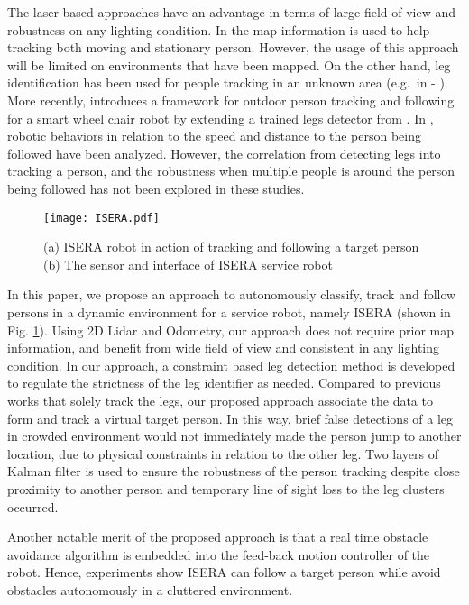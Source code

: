 \documentclass[10 pt,a4paper,conference]{IEEEtran}
\begin{document}
The laser based approaches have an advantage in terms of large field of
view and robustness on any lighting condition. In \cite{ref3} the map
information is used to help tracking both moving and stationary person.
However, the usage of this approach will be limited on environments that
have been mapped. On the other hand, leg identification has been used
for people tracking in an unknown area (e.g.~in \cite{ref4} -
\cite{ref7}). More recently, \cite{ref7} introduces a framework for
outdoor person tracking and following for a smart wheel chair robot by
extending a trained legs detector from \cite{ref8}. In
\citep{ref9, ref10}, robotic behaviors in relation to the speed and
distance to the person being followed have been analyzed. However, the
correlation from detecting legs into tracking a person, and the
robustness when multiple people is around the person being followed has
not been explored in these studies.

\begin{figure}[!t]
\centering
\texttt{[image: ISERA.pdf]}
\caption{(a) ISERA robot in action of tracking and following a
target person (b) The sensor and interface of ISERA service
robot}\label{fig_isera}
\end{figure}

In this paper, we propose an approach to autonomously classify, track
and follow persons in a dynamic environment for a service robot, namely
ISERA (shown in Fig. \ref{fig_isera}). Using 2D Lidar and Odometry, our
approach does not require prior map information, and benefit from wide
field of view and consistent in any lighting condition. In our approach,
a constraint based leg detection method is developed to regulate the
strictness of the leg identifier as needed. Compared to previous works
that solely track the legs, our proposed approach associate the data to
form and track a virtual target person. In this way, brief false
detections of a leg in crowded environment would not immediately made
the person jump to another location, due to physical constraints in
relation to the other leg. Two layers of Kalman filter is used to ensure
the robustness of the person tracking despite close proximity to another
person and temporary line of sight loss to the leg clusters occurred.

Another notable merit of the proposed approach is that a real time
obstacle avoidance algorithm is embedded into the feed-back motion
controller of the robot. Hence, experiments show ISERA can follow a
target person while avoid obstacles autonomously in a cluttered
environment.
\end{document}
